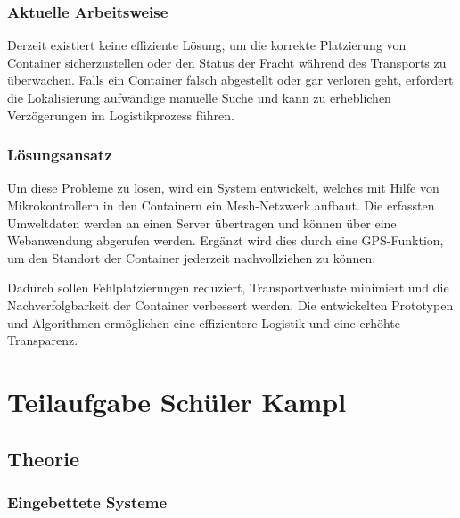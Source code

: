 \documentclass[
    headings=optiontotocandhead,%
    twoside,
    numbers=noenddot,%
    12pt, %
    titlepage, %
    parskip=full, %
    listof=leveldown, 
    numbers=noenddot, %
    a4paper,DIV=14,
    BCOR=15mm,
]{scrbook}
\makeatletter
\newcommand*{\authormark}{}
\newcommand*{\textauthor}[1]{%
   \renewcommand{\authormark}{\translate{author}: #1}%
   \ignorespaces
}
\newcommand*{\the@orig@section}{}
\let\the@orig@section\section
\renewcommand*{\section}{%
  \clearpage
  \the@orig@section
}
\makeatother
\begin{document}
\hypertarget{aktuelle-arbeitsweise}{%
\subsubsection{Aktuelle Arbeitsweise}\label{aktuelle-arbeitsweise}}

Derzeit existiert keine effiziente Lösung, um die korrekte Platzierung
von Container sicherzustellen oder den Status der Fracht während des
Transports zu überwachen. Falls ein Container falsch abgestellt oder gar
verloren geht, erfordert die Lokalisierung aufwändige manuelle Suche und
kann zu erheblichen Verzögerungen im Logistikprozess führen.

\hypertarget{luxf6sungsansatz}{%
\subsubsection{Lösungsansatz}\label{luxf6sungsansatz}}

Um diese Probleme zu lösen, wird ein System entwickelt, welches mit
Hilfe von Mikrokontrollern in den Containern ein Mesh-Netzwerk aufbaut.
Die erfassten Umweltdaten werden an einen Server übertragen und können
über eine Webanwendung abgerufen werden. Ergänzt wird dies durch eine
GPS-Funktion, um den Standort der Container jederzeit nachvollziehen zu
können.

Dadurch sollen Fehlplatzierungen reduziert, Transportverluste minimiert
und die Nachverfolgbarkeit der Container verbessert werden. Die
entwickelten Prototypen und Algorithmen ermöglichen eine effizientere
Logistik und eine erhöhte Transparenz.

\hypertarget{teilaufgabe-schuxfcler-kampl}{%
\section{Teilaufgabe Schüler Kampl}\label{teilaufgabe-schuxfcler-kampl}}

\textauthor{Maximilian Silvester Kampl}

\hypertarget{theorie}{%
\subsection{Theorie}\label{theorie}}

\hypertarget{eingebettete-systeme}{%
\subsubsection{Eingebettete Systeme}\label{eingebettete-systeme}}
\end{document}
